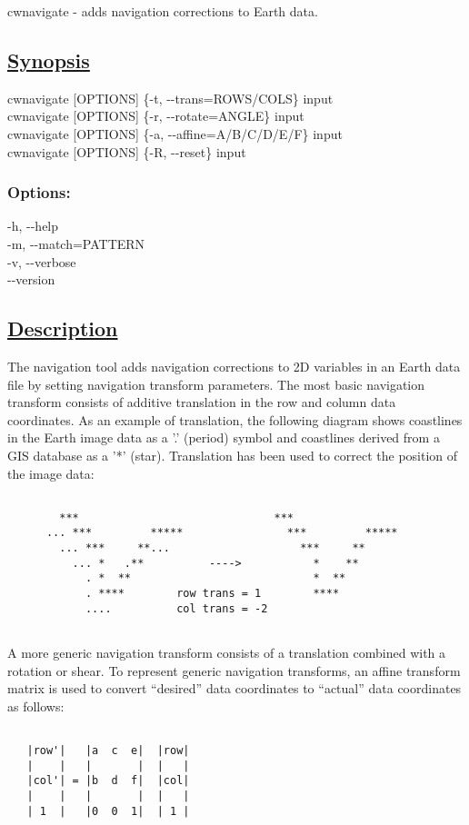    cwnavigate - adds navigation corrections to Earth data.  
\subsection*{\underline{Synopsis}}


  cwnavigate [OPTIONS] \{-t, -{-}trans=ROWS/COLS\} input\\ 
 cwnavigate [OPTIONS] \{-r, -{-}rotate=ANGLE\} input\\ 
 cwnavigate [OPTIONS] \{-a, -{-}affine=A/B/C/D/E/F\} input\\ 
 cwnavigate [OPTIONS] \{-R, -{-}reset\} input\\ 

\subsubsection*{Options:}


  -h, -{-}help \\ 
 -m, -{-}match=PATTERN \\ 
 -v, -{-}verbose \\ 
 -{-}version \\ 

\subsection*{\underline{Description}}


 The navigation tool adds navigation corrections to 2D variables in an Earth data file by setting navigation transform parameters. The most basic navigation transform consists of additive translation in the row and column data coordinates. As an example of translation, the following diagram shows coastlines in the Earth image data as a '.' (period) symbol and coastlines derived from a GIS database as a '*' (star). Translation has been used to correct the position of the image data:
\begin{verbatim}

        ***                              ***
      ... ***         *****                ***         *****
        ... ***     **...                    ***     **
          ... *   .**          ---->           *    **
            . *  **                            *  **
            . ****        row trans = 1        ****
            ....          col trans = -2
 
\end{verbatim}


 A more generic navigation transform consists of a translation combined with a rotation or shear. To represent generic navigation transforms, an affine transform matrix is used to convert ``desired'' data coordinates to ``actual'' data coordinates as follows:
\begin{verbatim}

   |row'|   |a  c  e|  |row|
   |    |   |       |  |   |
   |col'| = |b  d  f|  |col|
   |    |   |       |  |   |   
   | 1  |   |0  0  1|  | 1 | 
 
\end{verbatim}



